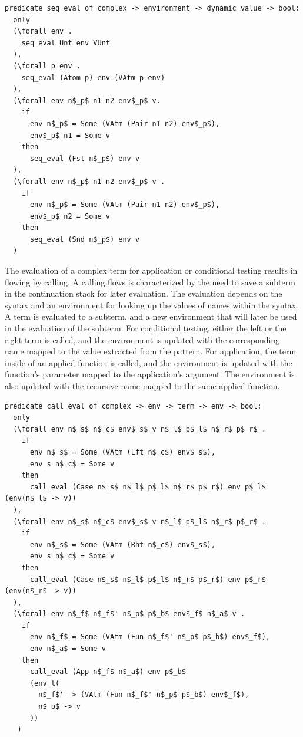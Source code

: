 \documentclass[10pt]{article}
\begin{document}
\begin{lstlisting}[language=logic, mathescape]
  predicate seq_eval of complex -> environment -> dynamic_value -> bool:
  only
  (\forall env . 
    seq_eval Unt env VUnt
  ),
  (\forall p env .
    seq_eval (Atom p) env (VAtm p env)
  ),
  (\forall env n$_p$ n1 n2 env$_p$ v. 
    if
      env n$_p$ = Some (VAtm (Pair n1 n2) env$_p$),
      env$_p$ n1 = Some v
    then
      seq_eval (Fst n$_p$) env v
  ),
  (\forall env n$_p$ n1 n2 env$_p$ v . 
    if
      env n$_p$ = Some (VAtm (Pair n1 n2) env$_p$), 
      env$_p$ n2 = Some v 
    then
      seq_eval (Snd n$_p$) env v
  )
  \end{lstlisting}

The evaluation of a complex term for application or conditional testing
results in flowing by calling. A calling flows is characterized
by the need to save a subterm in the continuation stack for later evaluation.
The evaluation depends on the syntax
and an environment for looking up the values of names within the syntax.
A term is evaluated to a subterm, and a new environment that will
later be used in the evaluation of the subterm. For conditional testing, either the left or the right
term is called, and the environment is updated with the corresponding name mapped to the
value extracted from the pattern. For application, the term inside of an applied function 
is called, and the environment is updated with the function's parameter mapped to the
application's argument. The environment is also updated with the recursive name mapped to the
same applied function.

\begin{lstlisting}[language=logic, mathescape]
  predicate call_eval of complex -> env -> term -> env -> bool:
  only
  (\forall env n$_s$ n$_c$ env$_s$ v n$_l$ p$_l$ n$_r$ p$_r$ .
    if
      env n$_s$ = Some (VAtm (Lft n$_c$) env$_s$),
      env_s n$_c$ = Some v
    then
      call_eval (Case n$_s$ n$_l$ p$_l$ n$_r$ p$_r$) env p$_l$ (env(n$_l$ -> v))
  ),
  (\forall env n$_s$ n$_c$ env$_s$ v n$_l$ p$_l$ n$_r$ p$_r$ .
    if 
      env n$_s$ = Some (VAtm (Rht n$_c$) env$_s$),
      env_s n$_c$ = Some v
    then
      call_eval (Case n$_s$ n$_l$ p$_l$ n$_r$ p$_r$) env p$_r$ (env(n$_r$ -> v))
  ),
  (\forall env n$_f$ n$_f$' n$_p$ p$_b$ env$_f$ n$_a$ v .
    if 
      env n$_f$ = Some (VAtm (Fun n$_f$' n$_p$ p$_b$) env$_f$),
      env n$_a$ = Some v
    then
      call_eval (App n$_f$ n$_a$) env p$_b$
      (env_l(
        n$_f$' -> (VAtm (Fun n$_f$' n$_p$ p$_b$) env$_f$),
        n$_p$ -> v
      ))
   )
  \end{lstlisting}
  
\end{document}
